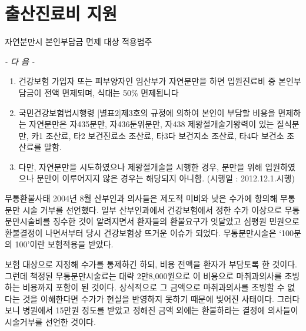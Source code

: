 \section{출산진료비 지원}
% 
{
자연분만시 본인부담금 면제 대상 적용범주\par
\begin{center}\emph{- 다   음 -}\end{center}
\begin{enumerate}[1.]\tightlist
\item 건강보험 가입자 또는 피부양자인 임산부가 자연분만을 하면 입원진료비 중 본인부담금이 전액 면제되며, 식대는 50\% 면제됩니다
\item 국민건강보험법시행령 [별표2]제3호의 규정에 의하여 본인이 부담할 비용을 면제하는 자연분만은 자435분만, 자436둔위분만, 자438 제왕절개술기왕력이 있는 질식분만, 카1 조산료, 타2 보건진료소 조산료, 타3다 보건지소 조산료, 타4다 보건소 조산료를 말함.
\item 다만, 자연분만을 시도하였으나 제왕절개술을 시행한 경우, 분만을 위해 입원하였으나 분만이 이루어지지 않은 경우는 해당되지 아니함.\newline
(시행일 : 2012.12.1.시행)
\end{enumerate}
}%

\par
\medskip
\begin{commentbox}{무통환불사태}
2004년 8월 산부인과 의사들은 제도적 미비와 낮은 수가에 항의해 무통분만 시술 거부를 선언했다. 일부 산부인과에서 건강보험에서 정한 수가 이상으로 무통분만시술비를 징수한 것이 알려지면서 환자들의 환불요구가 잇달았고 심평원 민원으로 환불결정이 나면서부터 당시 건강보험상 뜨거운 이슈가 되었다. 무통분만시술은 ‘100분의 100’이란 보험적용을 받았다.\par
\medskip

보험 대상으로 지정해 수가를 통제하긴 하되, 비용 전액을 환자가 부담토록 한 것이다. 그런데 책정된 무통분만시술료는 대략 2만8,000원으로 이 비용으로 마취과의사를 초빙하는 비용까지 포함이 된 것이다. 상식적으로 그 금액으로 마취과의사를 초빙할 수 없다는 것을 이해한다면 수가가 현실을 반영하지 못하기 때문에 빚어진 사태이다. 그러다보니 병원에서 15만원 정도를 받았고 정해진 금액 외에는 환불하라는 결정에 의사들이 시술거부를 선언한 것이다.
\end{commentbox}

